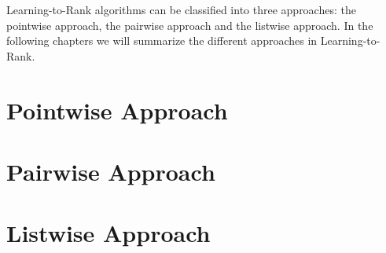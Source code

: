 Learning-to-Rank algorithms can be classified into three approaches: the pointwise approach, the pairwise approach and the listwise approach. In the following chapters we will summarize the different approaches in Learning-to-Rank.

\section{Pointwise Approach}

\section{Pairwise Approach}
\section{Listwise Approach}
